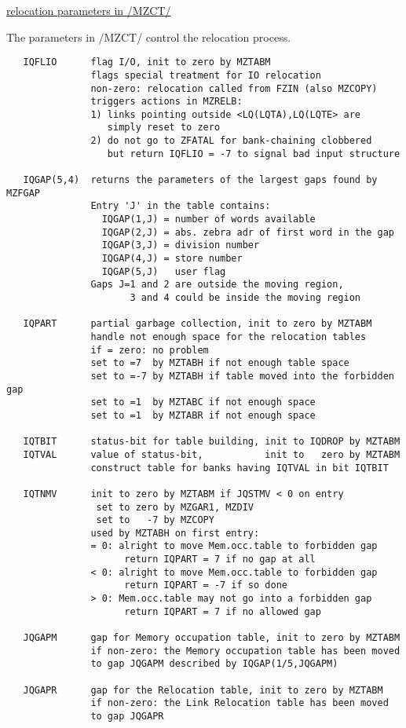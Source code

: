 \begin{flushright} \ul{\large relocation parameters in /MZCT/}
\end{flushright}

The parameters in /MZCT/ control the relocation process.

\begin{verbatim}
   IQFLIO      flag I/O, init to zero by MZTABM
               flags special treatment for IO relocation
               non-zero: relocation called from FZIN (also MZCOPY)
               triggers actions in MZRELB:
               1) links pointing outside <LQ(LQTA),LQ(LQTE> are
                  simply reset to zero
               2) do not go to ZFATAL for bank-chaining clobbered
                  but return IQFLIO = -7 to signal bad input structure

   IQGAP(5,4)  returns the parameters of the largest gaps found by MZFGAP
               Entry 'J' in the table contains:
                 IQGAP(1,J) = number of words available
                 IQGAP(2,J) = abs. zebra adr of first word in the gap
                 IQGAP(3,J) = division number
                 IQGAP(4,J) = store number
                 IQGAP(5,J)   user flag
               Gaps J=1 and 2 are outside the moving region,
                      3 and 4 could be inside the moving region

   IQPART      partial garbage collection, init to zero by MZTABM
               handle not enough space for the relocation tables
               if = zero: no problem
               set to =7  by MZTABH if not enough table space
               set to =-7 by MZTABH if table moved into the forbidden gap
               set to =1  by MZTABC if not enough space
               set to =1  by MZTABR if not enough space

   IQTBIT      status-bit for table building, init to IQDROP by MZTABM
   IQTVAL      value of status-bit,           init to   zero by MZTABM
               construct table for banks having IQTVAL in bit IQTBIT

   IQTNMV      init to zero by MZTABM if JQSTMV < 0 on entry
                set to zero by MZGAR1, MZDIV
                set to   -7 by MZCOPY
               used by MZTABH on first entry:
               = 0: alright to move Mem.occ.table to forbidden gap
                     return IQPART = 7 if no gap at all
               < 0: alright to move Mem.occ.table to forbidden gap
                     return IQPART = -7 if so done
               > 0: Mem.occ.table may not go into a forbidden gap
                     return IQPART = 7 if no allowed gap

   JQGAPM      gap for Memory occupation table, init to zero by MZTABM
               if non-zero: the Memory occupation table has been moved
               to gap JQGAPM described by IQGAP(1/5,JQGAPM)

   JQGAPR      gap for the Relocation table, init to zero by MZTABM
               if non-zero: the Link Relocation table has been moved
               to gap JQGAPR

\end{verbatim}


